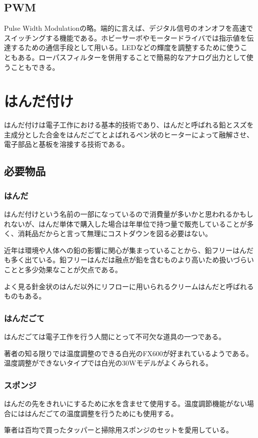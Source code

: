 \documentclass[a4paper,titlepage,here]{ujarticle}
\begin{document}
\subsection{PWM}
Pulse Width Modulationの略。端的に言えば、デジタル信号のオンオフを高速でスイッチングする機能である。ホビーサーボやモータードライバでは指示値を伝達するための通信手段として用いる。LEDなどの輝度を調整するために使うこともある。ローパスフィルターを併用することで簡易的なアナログ出力として使うこともできる。
\section{はんだ付け}
はんだ付けは電子工作における基本的技術であり、はんだと呼ばれる鉛とスズを主成分とした合金をはんだごてとよばれるペン状のヒーターによって融解させ、電子部品と基板を溶接する技術である。
\subsection{必要物品}
\subsubsection{はんだ}
はんだ付けという名前の一部になっているので消費量が多いかと思われるかもしれないが、はんだ単体で購入した場合は年単位で持つ量で販売していることが多く、消耗品だからと言って無理にコストダウンを図る必要はない。

近年は環境や人体への鉛の影響に関心が集まっていることから、鉛フリーはんだも多く出ている。鉛フリーはんだは融点が鉛を含むものより高いため扱いづらいことと多少効果なことが欠点である。

よく見る針金状のはんだ以外にリフローに用いられるクリームはんだと呼ばれるものもある。
\subsubsection{はんだごて}
はんだごては電子工作を行う人間にとって不可欠な道具の一つである。

著者の知る限りでは温度調整のできる白光のFX600が好まれているようである。温度調整ができないタイプでは白光の30Wモデルがよくみられる。
\subsubsection{スポンジ}
はんだの先をきれいにするために水を含ませて使用する。温度調節機能がない場合にははんだごての温度調整を行うためにも使用する。

筆者は百均で買ったタッパーと掃除用スポンジのセットを愛用している。
\end{document}
